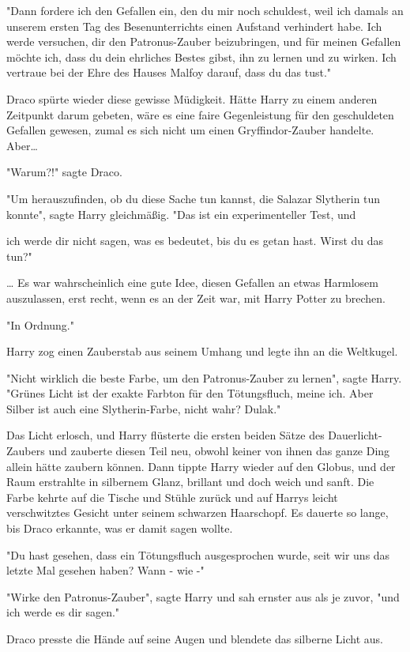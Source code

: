{"Dann fordere ich den Gefallen ein, den du mir noch schuldest, weil ich damals an unserem ersten Tag des Besenunterrichts einen Aufstand verhindert habe. Ich werde versuchen, dir den Patronus-Zauber beizubringen, und für meinen Gefallen möchte ich, dass du dein ehrliches Bestes gibst, ihn zu lernen und zu wirken. Ich vertraue bei der Ehre des Hauses Malfoy darauf, dass du das tust."

Draco spürte wieder diese gewisse Müdigkeit. Hätte Harry zu einem anderen Zeitpunkt darum gebeten, wäre es eine faire Gegenleistung für den geschuldeten Gefallen gewesen, zumal es sich nicht um einen Gryffindor-Zauber handelte. Aber…

"Warum?!" sagte Draco.

"Um herauszufinden, ob du diese Sache tun kannst, die Salazar Slytherin tun konnte", sagte Harry gleichmäßig. "Das ist ein experimenteller Test, und

ich werde dir nicht sagen, was es bedeutet, bis du es getan hast. Wirst du das tun?"

… Es war wahrscheinlich eine gute Idee, diesen Gefallen an etwas Harmlosem auszulassen, erst recht, wenn es an der Zeit war, mit Harry Potter zu brechen.

"In Ordnung."

Harry zog einen Zauberstab aus seinem Umhang und legte ihn an die Weltkugel.

"Nicht wirklich die beste Farbe, um den Patronus-Zauber zu lernen", sagte Harry. "Grünes Licht ist der exakte Farbton für den Tötungsfluch, meine ich. Aber Silber ist auch eine Slytherin-Farbe, nicht wahr? Dulak."

Das Licht erlosch, und Harry flüsterte die ersten beiden Sätze des Dauerlicht-Zaubers und zauberte diesen Teil neu, obwohl keiner von ihnen das ganze Ding allein hätte zaubern können. Dann tippte Harry wieder auf den Globus, und der Raum erstrahlte in silbernem Glanz, brillant und doch weich und sanft. Die Farbe kehrte auf die Tische und Stühle zurück und auf Harrys leicht verschwitztes Gesicht unter seinem schwarzen Haarschopf. Es dauerte so lange, bis Draco erkannte, was er damit sagen wollte.

"Du hast gesehen, dass ein Tötungsfluch ausgesprochen wurde, seit wir uns das letzte Mal gesehen haben? Wann - wie -"

"Wirke den Patronus-Zauber", sagte Harry und sah ernster aus als je zuvor, "und ich werde es dir sagen."

Draco presste die Hände auf seine Augen und blendete das silberne Licht aus.

}
